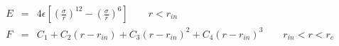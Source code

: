 \documentclass[12pt]{article}
\begin{document}
\begin{eqnarray*}
 E & = & 4 \epsilon \left[ \left(\frac{\sigma}{r}\right)^{12} - 
                       \left(\frac{\sigma}{r}\right)^6 \right]
                       \qquad r < r_{in} \\
 F & = & C_1 + C_2 (r - r_{in}) + C_3 (r - r_{in})^2 + C_4 (r - r_{in})^3 
                       \qquad r_{in} < r < r_c
\end{eqnarray*}                           
\end{document}
